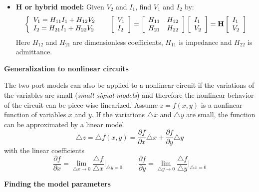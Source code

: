 \begin{itemize}
\begin{itemize}
\item {\bf H or hybrid model:} Given $V_2$ and $I_1$, find $V_1$ and $I_2$ by:
  \[\left\{ \begin{array}{l} 
    V_1=H_{11}I_1+H_{12}V_2 \\
    I_2=H_{21}I_1+H_{22}V_2 \end{array} \right.\;\;\;\;\;
  \left[ \begin{array}{l} V_1 \\ I_2\end{array} \right]=
  \left[ \begin{array}{ll} H_{11} & H_{12}\\H_{21} & H_{22}\end{array}\right]
  \left[ \begin{array}{l} I_1 \\ V_2\end{array} \right]
  ={\bf H}\left[ \begin{array}{l} I_1 \\ V_2\end{array} \right]  \]
  Here $H_{12}$ and $H_{21}$ are dimensionless coefficients, $H_{11}$ is 
  impedance and $H_{22}$ is admittance. 

\end{itemize}

{\bf Generalization to nonlinear circuits}

The two-port models can also be applied to a nonlinear circuit if the 
variations of the variables are small ({\em small signal models}) and 
therefore the nonlinear behavior of the circuit can be piece-wise 
linearized. Assume $z=f(x,y)$ is a nonlinear function of variables 
$x$ and $y$. If the variations $\triangle x$ and $\triangle y$ are 
small, the function can be approximated by a linear model 
\[
\triangle z=\triangle f(x,y)=\frac{\partial f}{\partial x}\triangle x +
\frac{\partial f}{\partial y}\triangle y  
\]
with the linear coefficients
\[
\frac{\partial f}{\partial x}=\lim_{\triangle x\rightarrow 0}
\frac{\triangle f}{\triangle x}\bigg|_{\triangle y=0}
\;\;\;\;\;\;\;\;
\frac{\partial f}{\partial y}=\lim_{\triangle y\rightarrow 0}
\frac{\triangle f}{\triangle y}\bigg|_{\triangle x=0}
\]

{\bf Finding the model parameters}


\end{itemize}

